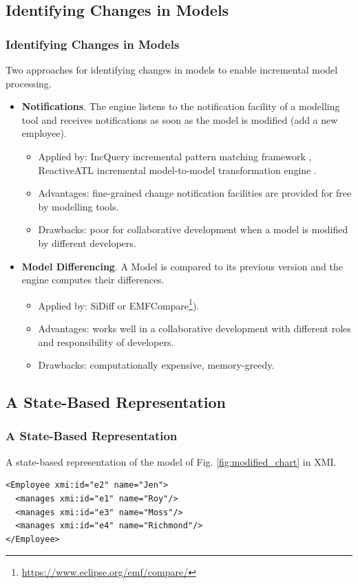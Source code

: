\documentclass{beamer}
\begin{document}
\begin{frame}
\section{Identifying Changes in Models}
\frametitle{Identifying Changes in Models}
Two approaches for identifying changes in models to enable incremental model processing.
\begin{itemize}
\item \textbf{Notifications}. The engine listens to the notification facility of a modelling tool and receives notifications as soon as the model is modified (add a new employee). 
\begin{itemize}
\item Applied by: IncQuery incremental pattern matching framework \cite{rath2012derived}, ReactiveATL incremental model-to-model transformation engine \cite{ogunyomi2015property}. 
\item Advantages: fine-grained change notification facilities are provided for free by modelling tools.
\item Drawbacks: poor for collaborative development when a model is modified by different developers.
\end{itemize} 
\item \textbf{Model Differencing}. A Model is compared to its previous version and the engine computes their differences.    
\begin{itemize}
\item Applied by: SiDiff \cite{kelter2005generic} or EMFCompare\footnote{\url{https://www.eclipse.org/emf/compare/}}).
\item Advantages: works well in a collaborative
development with different roles and responsibility of developers.
\item Drawbacks: computationally expensive, memory-greedy.
\end{itemize}
\end{itemize}
\end{frame}

\begin{frame}[fragile]
\section{A State-Based Representation}
\frametitle{A State-Based Representation}
A state-based representation of the model of Fig. \ref{fig:modified_chart} in XMI.
\begin{lstlisting}[style=xmi,label=lst:xmimodel]
<Employee xmi:id="e2" name="Jen">
  <manages xmi:id="e1" name="Roy"/>
  <manages xmi:id="e3" name="Moss"/>
  <manages xmi:id="e4" name="Richmond"/>
</Employee>
\end{lstlisting}
\end{frame}
\end{document}
